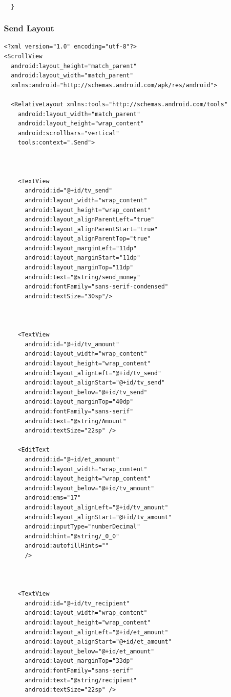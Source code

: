 \documentclass[11pt, a4paper]{article}
\begin{document}
\begin{appendices}
\begin{lstlisting}
  
  }
\end{lstlisting}
\subsubsection{Send Layout}
\begin{lstlisting}
<?xml version="1.0" encoding="utf-8"?>
<ScrollView
  android:layout_height="match_parent"
  android:layout_width="match_parent"
  xmlns:android="http://schemas.android.com/apk/res/android">

  <RelativeLayout xmlns:tools="http://schemas.android.com/tools"
    android:layout_width="match_parent"
    android:layout_height="wrap_content"
    android:scrollbars="vertical"
    tools:context=".Send">



    <TextView
      android:id="@+id/tv_send"
      android:layout_width="wrap_content"
      android:layout_height="wrap_content"
      android:layout_alignParentLeft="true"
      android:layout_alignParentStart="true"
      android:layout_alignParentTop="true"
      android:layout_marginLeft="11dp"
      android:layout_marginStart="11dp"
      android:layout_marginTop="11dp"
      android:text="@string/send_money"
      android:fontFamily="sans-serif-condensed"
      android:textSize="30sp"/>



    <TextView
      android:id="@+id/tv_amount"
      android:layout_width="wrap_content"
      android:layout_height="wrap_content"
      android:layout_alignLeft="@+id/tv_send"
      android:layout_alignStart="@+id/tv_send"
      android:layout_below="@+id/tv_send"
      android:layout_marginTop="40dp"
      android:fontFamily="sans-serif"
      android:text="@string/Amount"
      android:textSize="22sp" />

    <EditText
      android:id="@+id/et_amount"
      android:layout_width="wrap_content"
      android:layout_height="wrap_content"
      android:layout_below="@+id/tv_amount"
      android:ems="17"
      android:layout_alignLeft="@+id/tv_amount"
      android:layout_alignStart="@+id/tv_amount"
      android:inputType="numberDecimal"
      android:hint="@string/_0_0"
      android:autofillHints=""
      />



    <TextView
      android:id="@+id/tv_recipient"
      android:layout_width="wrap_content"
      android:layout_height="wrap_content"
      android:layout_alignLeft="@+id/et_amount"
      android:layout_alignStart="@+id/et_amount"
      android:layout_below="@+id/et_amount"
      android:layout_marginTop="33dp"
      android:fontFamily="sans-serif"
      android:text="@string/recipient"
      android:textSize="22sp" />


\end{lstlisting}
\end{appendices}
\end{document}
